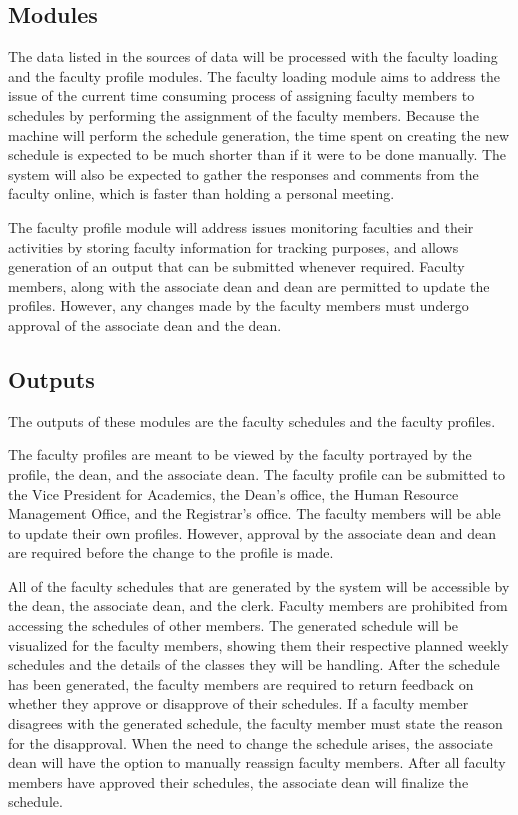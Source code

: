 \subsection{Modules}
The data listed in the sources of data will be processed with the faculty loading and the faculty profile modules. The faculty loading module aims to address the issue of the current time consuming process of assigning faculty members to schedules by performing the assignment of the faculty members. Because the machine will perform the schedule generation, the time spent on creating the new schedule is expected to be much shorter than if it were to be done manually. The system will also be expected to gather the responses and comments from the faculty online, which is faster than holding a personal meeting. 

The faculty profile module will address issues monitoring faculties and their activities by storing faculty information for tracking purposes, and allows generation of an output that can be submitted whenever required. Faculty members, along with the associate dean and dean are permitted to update the profiles. However, any changes made by the faculty members must undergo approval of the associate dean and the dean.

\subsection{Outputs}
The outputs of these modules are the faculty schedules and the faculty profiles.

The faculty profiles are meant to be viewed by the faculty portrayed by the profile, the dean, and the associate dean. The faculty profile can be submitted to the Vice President for Academics, the Dean's office, the Human Resource Management Office, and the Registrar's office. The faculty members will be able to update their own profiles. However, approval by the associate dean and dean are required before the change to the profile is made.

All of the faculty schedules that are generated by the system will be accessible by the dean, the associate dean, and the clerk. Faculty members are prohibited from accessing the schedules of other members. The generated schedule will be visualized for the faculty members, showing them their respective planned weekly schedules and the details of the classes they will be handling. After the schedule has been generated, the faculty members are required to return feedback on whether they approve or disapprove of their schedules. If a faculty member disagrees with the generated schedule, the faculty member must state the reason for the disapproval. When the need to change the schedule arises, the associate dean will have the option to manually reassign faculty members. After all faculty members have approved their schedules, the associate dean will finalize the schedule.

